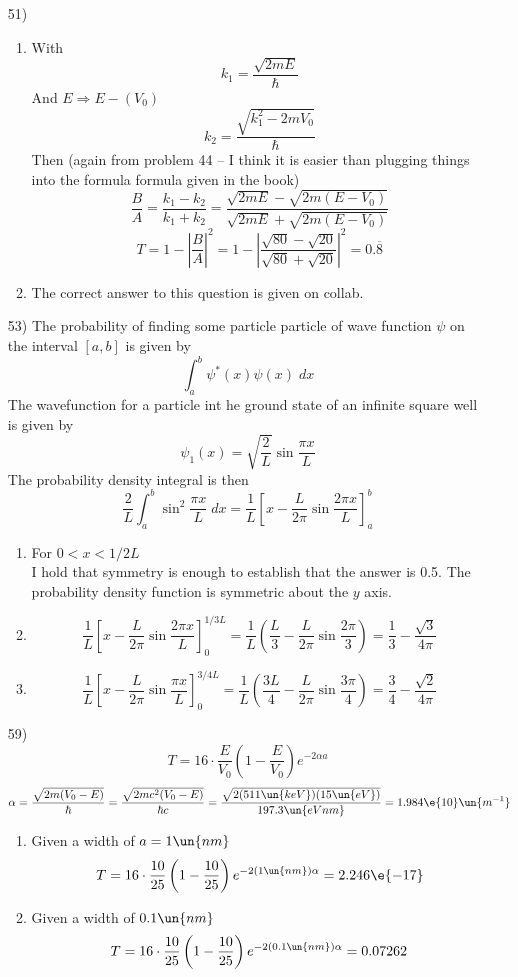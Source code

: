 \documentclass[12pt]{2620hw}
\begin{document}
\begin{enumerate}
\item [51)]
\begin{enumerate}
    \item With
	\[
		k_1 = \frac{\sqrt{2mE}}{\hbar}	
	\]
	And $E \Rightarrow E - (V_0)$
	\[
		k_2 = \frac{\sqrt{k_1^2 - 2mV_0}}{\hbar}
	\]
	Then (again from problem 44 -- I think it is easier than plugging things into the formula formula given in the book)
	\[
		\frac{B}{A} = \frac{k_1-k_2}{k_1+k_2} = \frac{\sqrt{2mE} - \sqrt{2m(E-V_0)}}{\sqrt{2mE} + \sqrt{2m(E-V_0)}}
	\]
	\[
		T = 1 - \left| \frac{B}{A} \right|^2 = 1 - \left| \frac{\sqrt{80} - \sqrt{20}}{\sqrt{80} + \sqrt{20}} \right|^2 = 0.\overline{8}
	\]
	\item The correct answer to this question is given on collab.
\end{enumerate}

\item [53)] The probability of finding some particle particle of wave function $\psi$ on the interval $[a, b]$ is given by 
\[
	\int_a^b \psi^*(x)\psi(x) \; dx
\]
The wavefunction for a particle int he ground state of an infinite square well is given by
\[
	\psi_1(x) = \sqrt{ \frac{2}{L} } \sin \frac{\pi x}{L}	
\]
The probability density integral is then
\[
	\frac{2}{L} \int_a^b \sin^2 \frac{\pi x}{L} \; dx = \frac{1}{L} \left[ x - \frac{L}{2\pi}\sin \frac{2 \pi x}{L} \right]_a^b	
\]
\begin{enumerate}
    \item For $ 0 < x < 1/2 L $\\
	I hold that symmetry is enough to establish that the answer is 0.5. The probability density function is symmetric about the $y$ axis.
	\item
	\[
		\frac{1}{L} \left[ x - \frac{L}{2\pi}\sin \frac{2 \pi x}{L} \right]_0^{1/3L} = \frac{1}{L} \left( \frac{L}{3} - \frac{L}{2\pi}\sin\frac{2\pi}{3} \right) = \frac{1}{3} - \frac{\sqrt{3}}{4\pi}
	\]
	\item
	\[
		\frac{1}{L} \left[ x - \frac{L}{2\pi}\sin \frac{\pi x}{L} \right]_0^{3/4L} = \frac{1}{L} \left( \frac{3L}{4} - \frac{L}{2 \pi}\sin \frac{3 \pi}{4} \right) = \frac{3}{4} - \frac{\sqrt{2}}{4 \pi}
	\]
\end{enumerate}

\item [59)]
	\[
		T  = 16 \cdot \frac{E}{V_0} \left( 1 - \frac{E}{V_0} \right)e^{-2\alpha a}
	\]
	\[
		\alpha  = \frac{\sqrt{ 2m(V_0 - E)}}{\hbar} = \frac{\sqrt{2mc^2(V_0-E)}}{\hbar c} = \frac{\sqrt{2(511\un{keV})(15\un{eV})}}{197.3\un{eVnm}} = 1.984\e{10}\un{m^{-1}}
	\]
\begin{enumerate}
	\item Given a width of $a = 1\un{nm}$
	\[
		T  = 16 \cdot \frac{10}{25} \left( 1 - \frac{10}{25} \right)e^{-2(1 \un{nm})\alpha } = 2.246\e{-17}
	\]
	\item Given a width of $0.1\un{nm}$
	\[
		T  = 16 \cdot \frac{10}{25} \left( 1 - \frac{10}{25} \right)e^{-2 (0.1 \un{nm}) \alpha } = 0.07262
	\]


\end{enumerate}
\end{enumerate}
\end{document}
